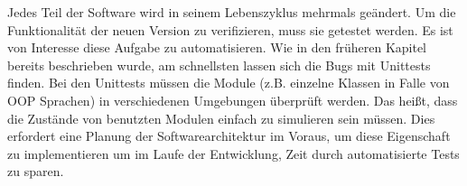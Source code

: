 Jedes Teil der Software wird in seinem Lebenszyklus mehrmals geändert. 
Um die Funktionalität der neuen Version zu verifizieren, muss sie getestet werden.
Es ist von Interesse diese Aufgabe zu automatisieren. 
Wie in den früheren Kapitel bereits beschrieben wurde, am schnellsten lassen sich die Bugs mit Unittests finden. 
Bei den Unittests müssen die Module (z.B. einzelne Klassen in Falle von OOP Sprachen) in verschiedenen Umgebungen überprüft werden. 
Das heißt, dass die Zustände von benutzten Modulen einfach zu simulieren sein müssen.
Dies erfordert eine Planung der Softwarearchitektur im Voraus, 
um diese Eigenschaft zu implementieren um im Laufe der Entwicklung, Zeit durch automatisierte Tests zu sparen.
